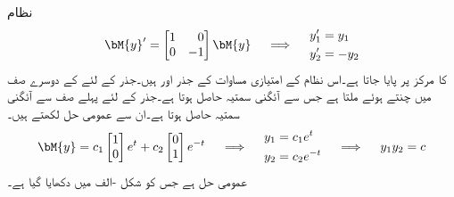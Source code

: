 نظام
\begin{gather}\label{مساوات_نظام_نقطہ_زین}
\begin{aligned}
\bM{y}'=\begin{bmatrix*}[r] 1&0 \\ 0&-1 \end{bmatrix*} \bM{y}
\end{aligned}\quad \implies \quad
\begin{aligned}
y_1'&=y_1\\ 
y_2'&=-y_2
\end{aligned}
\end{gather}
کا  مرکز پر پایا جاتا ہے۔اس نظام کے امتیازی مساوات  کے جذر  اور  ہیں۔جذر  کے لئے  کے دوسرے صف  میں  چنتے ہوئے  ملتا ہے جس سے  آئگنی سمتیہ  حاصل ہوتا ہے۔جذر  کے لئے پہلے صف سے آئگنی سمتیہ  حاصل ہوتا ہے۔ان سے عمومی حل لکھتے ہیں۔
\begin{gather}
\begin{aligned}
\bM{y}=c_1\begin{bmatrix}1 \\ 0  \end{bmatrix} e^t+c_2\begin{bmatrix}  0\\1 \end{bmatrix} e^{-t}
\end{aligned} \quad \implies\quad
\begin{aligned}
y_1&=c_1e^t\\
y_2&=c_2e^{-t}
\end{aligned}\quad \implies \quad
\begin{aligned}
y_1y_2=c
\end{aligned}
\end{gather}
عمومی حل  ہے جس کو شکل -الف میں دکھایا گیا ہے۔

